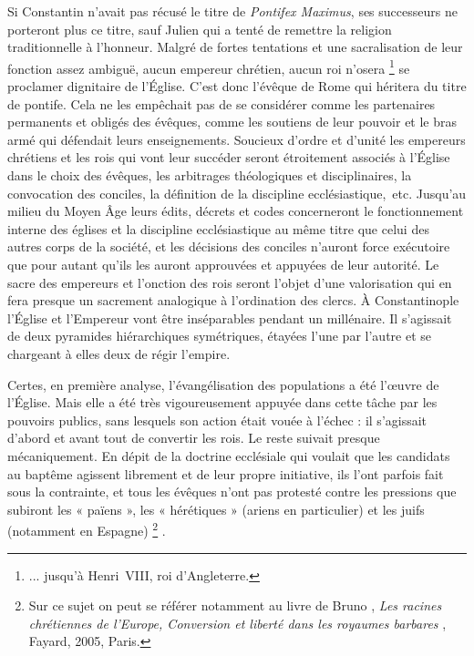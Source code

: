  Si Constantin n'avait pas récusé le titre de \emph{Pontifex Maximus}, ses successeurs ne porteront plus ce titre, sauf Julien qui a tenté de remettre la religion traditionnelle à l'honneur. Malgré de fortes tentations et une sacralisation de leur fonction assez ambiguë, aucun empereur chrétien, aucun roi n'osera%
\footnote{... jusqu'à Henri~VIII, roi d'Angleterre.} 
se proclamer dignitaire de l'Église. C'est donc l'évêque de Rome qui héritera du titre de pontife. Cela ne les empêchait pas de se considérer comme les partenaires permanents et obligés des évêques, comme les soutiens de leur pouvoir et le bras armé qui défendait leurs enseignements. Soucieux d'ordre et d'unité les empereurs chrétiens et les rois qui vont leur succéder seront étroitement associés à l'Église dans le choix des évêques, les arbitrages théologiques et disciplinaires, la convocation des conciles, la définition de la discipline ecclésiastique,~etc. Jusqu'au milieu du Moyen Âge leurs édits, décrets et codes concerneront le fonctionnement interne des églises et la discipline ecclésiastique au même titre que celui des autres corps de la société, et les décisions des conciles n'auront force exécutoire que pour autant qu'ils les auront approuvées et appuyées de leur autorité. Le sacre des empereurs et l'onction des rois seront l'objet d'une valorisation qui en fera presque un sacrement analogique à l'ordination des clercs. À Constantinople l'Église et l'Empereur vont être inséparables pendant un millénaire. Il s'agissait de deux pyramides hiérarchiques symétriques, étayées l'une par l'autre et se chargeant à elles deux de régir l'empire. 

 Certes, en première analyse, l'évangélisation des populations a été l'œuvre de l'Église. Mais elle a été très vigoureusement appuyée dans cette tâche par les pouvoirs publics, sans lesquels son action était vouée à l'échec : il s'agissait d'abord et avant tout de convertir les rois. Le reste suivait presque mécaniquement. En dépit de la doctrine ecclésiale qui voulait que les candidats au baptême agissent librement et de leur propre initiative, ils l'ont parfois fait sous la contrainte, et tous les évêques n'ont pas protesté contre les pressions que subiront les « païens », les « hérétiques » (ariens en particulier) et les juifs (notamment en Espagne)%
\footnote{Sur ce sujet on peut se référer notamment au livre de Bruno , \emph{Les racines chrétiennes de l'Europe, Conversion et liberté dans les royaumes barbares }, Fayard, 2005, Paris.}%
. 


